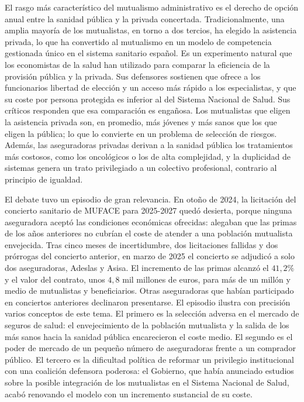 \documentclass[10pt,a4paper]{article}
\begin{document}
El rasgo más característico del mutualismo administrativo es el derecho de opción anual entre la sanidad pública y la privada concertada. Tradicionalmente, una amplia mayoría de los mutualistas, en torno a dos tercios, ha elegido la asistencia privada, lo que ha convertido al mutualismo en un modelo de competencia gestionada único en el sistema sanitario español. Es un experimento natural que los economistas de la salud han utilizado para comparar la eficiencia de la provisión pública y la privada. Sus defensores sostienen que ofrece a los funcionarios libertad de elección y un acceso más rápido a los especialistas, y que su coste por persona protegida es inferior al del Sistema Nacional de Salud. Sus críticos responden que esa comparación es engañosa. Los mutualistas que eligen la asistencia privada son, en promedio, más jóvenes y más sanos que los que eligen la pública; lo que lo convierte en un problema de selección de riesgos. Además, las aseguradoras privadas derivan a la sanidad pública los tratamientos más costosos, como los oncológicos o los de alta complejidad, y la duplicidad de sistemas genera un trato privilegiado a un colectivo profesional, contrario al principio de igualdad.

El debate tuvo un episodio de gran relevancia. En otoño de 2024, la licitación del concierto sanitario de MUFACE para 2025-2027 quedó desierta, porque ninguna aseguradora aceptó las condiciones económicas ofrecidas: alegaban que las primas de los años anteriores no cubrían el coste de atender a una población mutualista envejecida. Tras cinco meses de incertidumbre, dos licitaciones fallidas y dos prórrogas del concierto anterior, en marzo de 2025 el concierto se adjudicó a solo dos aseguradoras, Adeslas y Asisa. El incremento de las primas alcanzó el $41,2\%$ y el valor del contrato, unos $4,8$ mil millones de euros, para más de un millón y medio de mutualistas y beneficiarios. Otras aseguradoras que habían participado en conciertos anteriores declinaron presentarse. El episodio ilustra con precisión varios conceptos de este tema. El primero es la selección adversa en el mercado de seguros de salud: el envejecimiento de la población mutualista y la salida de los más sanos hacia la sanidad pública encarecieron el coste medio. El segundo es el poder de mercado de un pequeño número de aseguradoras frente a un comprador público. El tercero es la dificultad política de reformar un privilegio institucional con una coalición defensora poderosa: el Gobierno, que había anunciado estudios sobre la posible integración de los mutualistas en el Sistema Nacional de Salud, acabó renovando el modelo con un incremento sustancial de su coste.
\end{document}
